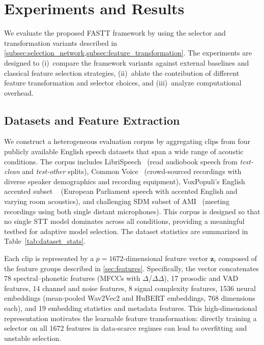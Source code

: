\documentclass[journal]{IEEEtran}
\begin{document}
    \section{Experiments and Results}
    \label{sec:experiments}

    We evaluate the proposed FASTT framework by using the selector and transformation
    variants described in \cref{subsec:selection_network,subsec:feature_transformation}.
    The experiments are designed to (i)~compare the framework variants against
    external baselines and classical feature selection strategies, (ii)~ablate the
    contribution of different feature transformation and selector choices, and (iii)~analyze
    computational overhead.

    \subsection{Datasets and Feature Extraction}
    \label{subsec:datasets_features}

    We construct a heterogeneous evaluation corpus by aggregating clips from four
    publicly available English speech datasets that span a wide range of acoustic
    conditions. The corpus includes LibriSpeech~\cite{panayotov2015librispeech}
    (read audiobook speech from \textit{test-clean} and \textit{test-other} splits),
    Common Voice~\cite{ardila2020commonvoice} (crowd-sourced recordings with
    diverse speaker demographics and recording equipment), VoxPopuli's English accented subset ~\cite{wang2021voxpopuli}
    (European Parliament speech with accented English and varying room acoustics),
    and challenging SDM subset of AMI~\cite{carletta2005ami} (meeting recordings using both single distant microphones). This corpus is designed so that no single STT model dominates across all conditions, providing a meaningful testbed for adaptive model selection. The dataset statistics are summarized in Table~\ref{tab:dataset_stats}.

    

    Each clip is represented by a $p\!=\!1672$-dimensional feature vector $\mathbf{z}
    _{i}$ composed of the feature groups described in \cref{sec:features}.
    Specifically, the vector concatenates 78 spectral--phonetic features (MFCCs with
    $\Delta$/$\Delta\Delta$), 17 prosodic and VAD features, 14 channel and noise
    features, 8 signal complexity features, 1536 neural embeddings (mean-pooled Wav2Vec2
    and HuBERT embeddings, 768 dimensions each), and 19 embedding statistics and
    metadata features. This high-dimensional representation motivates the learnable
    feature transformation: directly training a selector on all 1672 features in
    data-scarce regimes can lead to overfitting and unstable selection.
\end{document}
